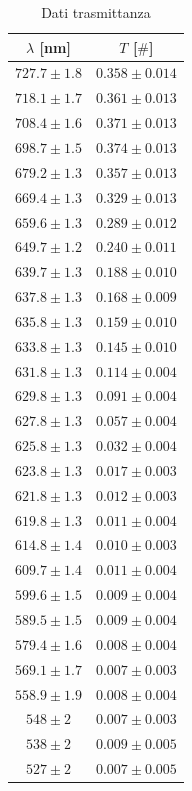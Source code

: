 \begin{table}[H]
\centering
\begin{tabular}{|c|c|}
\hline
$\lambda$ [nm] & $T$ [$\#$] \\\hline\hline

$727.7 \pm 1.8$ & $0.358 \pm 0.014$ \\\hline
$718.1 \pm 1.7$ & $0.361 \pm 0.013$ \\\hline
$708.4 \pm 1.6$ & $0.371 \pm 0.013$ \\\hline
$698.7 \pm 1.5$ & $0.374 \pm 0.013$ \\\hline
$679.2 \pm 1.3$ & $0.357 \pm 0.013$ \\\hline
$669.4 \pm 1.3$ & $0.329 \pm 0.013$ \\\hline
$659.6 \pm 1.3$ & $0.289 \pm 0.012$ \\\hline
$649.7 \pm 1.2$ & $0.240 \pm 0.011$ \\\hline
$639.7 \pm 1.3$ & $0.188 \pm 0.010$ \\\hline
$637.8 \pm 1.3$ & $0.168 \pm 0.009$ \\\hline
$635.8 \pm 1.3$ & $0.159 \pm 0.010$ \\\hline
$633.8 \pm 1.3$ & $0.145 \pm 0.010$ \\\hline
$631.8 \pm 1.3$ & $0.114 \pm 0.004$ \\\hline
$629.8 \pm 1.3$ & $0.091 \pm 0.004$ \\\hline
$627.8 \pm 1.3$ & $0.057 \pm 0.004$ \\\hline
$625.8 \pm 1.3$ & $0.032 \pm 0.004$ \\\hline
$623.8 \pm 1.3$ & $0.017 \pm 0.003$ \\\hline
$621.8 \pm 1.3$ & $0.012 \pm 0.003$ \\\hline
$619.8 \pm 1.3$ & $0.011 \pm 0.004$ \\\hline
$614.8 \pm 1.4$ & $0.010 \pm 0.003$ \\\hline
$609.7 \pm 1.4$ & $0.011 \pm 0.004$ \\\hline
$599.6 \pm 1.5$ & $0.009 \pm 0.004$ \\\hline
$589.5 \pm 1.5$ & $0.009 \pm 0.004$ \\\hline
$579.4 \pm 1.6$ & $0.008 \pm 0.004$ \\\hline
$569.1 \pm 1.7$ & $0.007 \pm 0.003$ \\\hline
$558.9 \pm 1.9$ & $0.008 \pm 0.004$ \\\hline
$548 \pm 2$ & $0.007 \pm 0.003$ \\\hline
$538 \pm 2$ & $0.009 \pm 0.005$ \\\hline
$527 \pm 2$ & $0.007 \pm 0.005$ \\
\hline
\end{tabular}
\caption{Dati trasmittanza}
\label{tab:trasmittanza}
\end{table}


